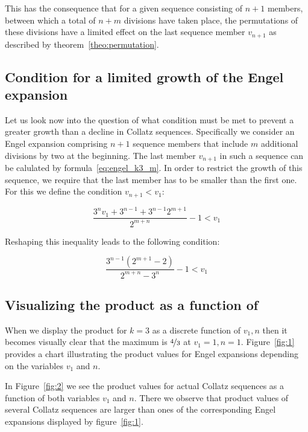 \documentclass[12pt]{amsart}
\theoremstyle{definition}
\begin{document}
\par\bigskip
This has the consequence that for a given sequence consisting of $n+1$ members, between which a total of $n+m$ divisions have taken place, the permutations of these divisions have a limited effect on the last sequence member $v_{n+1}$ as described by theorem~\ref{theo:permutation}.

\vspace{1em}
\subsection{Condition for a limited growth of the Engel expansion}
\label{appx:condition_limited_growth}
Let us look now into the question of what condition must be met to prevent a greater growth than a decline in Collatz sequences. Specifically we consider an Engel expansion comprising $n+1$ sequence members that include $m$ additional divisions by two at the beginning. The last member $v_{n+1}$ in such a sequence can be calulated by formula~\ref{eq:engel_k3_m}. In order to restrict the growth of this sequence, we require that the last member has to be smaller than the first one. For this we define the condition $v_{n+1}<v_1$:

\[
\frac{3^nv_1+3^{n-1}+3^{n-1}2^{m+1}}{2^{m+n}}-1<v_1
\]

\par\medskip\noindent
Reshaping this inequality leads to the following condition:

\begin{equation}
\label{eq:condition_limited_growth}
\frac{3^{n-1}\left(2^{m+1}-2\right)}{2^{m+n}-3^n}-1<v_1
\end{equation}

\vspace{1em}
\subsection{Visualizing the product as a function of }
\label{appx:permuting_divisions}

When we display the product for $k=3$ as a discrete function of $v_1,n$ then it becomes visually clear that the maximum is $\nicefrac{4}{3}$ at $v_1=1,n=1$. Figure~\ref{fig:1} provides a chart illustrating the product values for Engel expansions depending on the variables $v_1$ and $n$.

\par\medskip
In Figure~\ref{fig:2} we see the product values for actual Collatz sequences as a function of both variables $v_1$ and $n$. There we observe that product values of several Collatz sequences are larger than ones of the corresponding Engel expansions displayed by figure~\ref{fig:1}.
\end{document}

